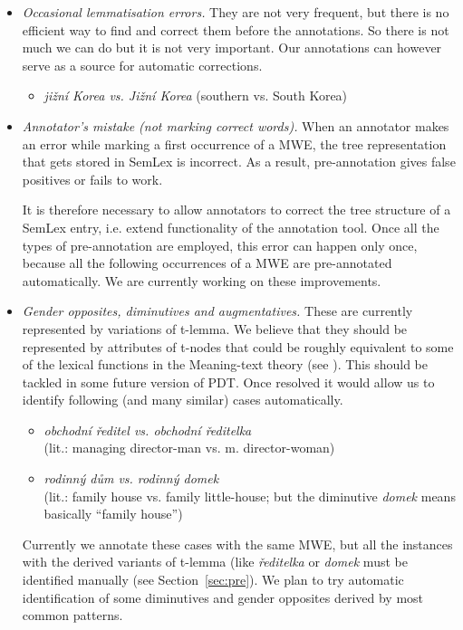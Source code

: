 \begin{itemize}
%
\item \emph{Occasional lemmatisation errors.} They are not very frequent, but there is no efficient way to find and correct them before the annotations. So there is not much we can do but it is not very important. Our annotations can however serve as a source for automatic corrections.
	\begin{itemize}
	\item \textit{jižní Korea {\rm vs.} Jižní Korea} (southern vs. South Korea)
	\end{itemize}
\item \emph{Annotator's mistake (not marking correct words).} When an annotator makes an error while marking a first occurrence of a MWE, the tree representation that gets stored in SemLex is incorrect. As a result, pre-annotation gives false positives or fails to work. 

It is therefore necessary to allow annotators to correct the tree structure of a SemLex entry, i.e. extend functionality of the annotation tool. Once all the types of pre-annotation are employed, this error can happen only once, because all the following occurrences of a MWE are pre-annotated automatically. We are currently working on these improvements.
%
\item \emph{Gender opposites, diminutives and augmentatives.} These are currently represented by variations of t-lemma. 
We believe that they should be represented by attributes of t-nodes %
that could be roughly equivalent to some of the lexical functions in the Meaning-text theory (see \cite{melcuk:1992}).
This should be tackled in some future version of PDT. Once resolved it would allow us to identify following (and many similar) cases automatically. 
	\begin{itemize}
	\item \textit{obchodní ředitel {\rm vs.} obchodní ředitelka} \\(lit.: managing director-man vs. m. director-woman)
	\item \textit{rodinný dům {\rm vs.} rodinný domek} \\(lit.: family house vs. family little-house; but the diminutive \emph{domek} means basically “family house”)
	\end{itemize}
%
Currently we annotate these cases with the same MWE, but all the instances with the derived variants of t-lemma (like \emph{ředitelka } or \emph{domek} must be identified manually (see Section~\ref{sec:pre}). We plan to try automatic identification of some diminutives and gender opposites derived by most common patterns.


\end{itemize}
